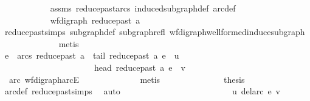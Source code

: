 \begin{isabellebody}
\ \ \ \ \ \ \ \ \ \ \isamarkupfalse%
\ assms\ reduce{\isacharunderscore}{\kern0pt}past{\isacharunderscore}{\kern0pt}arcs{}\ induced{\isacharunderscore}{\kern0pt}subgraph{\isacharunderscore}{\kern0pt}def\ arc{\isacharunderscore}{\kern0pt}def\ \isanewline
\ \ \ \ \ \ \ \ \isamarkupfalse%
\ {\isacharminus}{\kern0pt}\isanewline
\ \ \ \ \ \ \ \ \ \ \isamarkupfalse%
\ {\isachardoublequoteopen}wf{\isacharunderscore}{\kern0pt}digraph\ {\isacharparenleft}{\kern0pt}reduce{\isacharunderscore}{\kern0pt}past\ a{\isacharparenright}{\kern0pt}{\isachardoublequoteclose}\isanewline
\ \ \ \ \ \ \ \ \ \ \ \ \isamarkupfalse%
\ reduce{\isacharunderscore}{\kern0pt}past{\isachardot}{\kern0pt}simps\ subgraph{\isacharunderscore}{\kern0pt}def\ subgraph{\isacharunderscore}{\kern0pt}refl\ wf{\isacharunderscore}{\kern0pt}digraph{\isachardot}{\kern0pt}wellformed{\isacharunderscore}{\kern0pt}induce{\isacharunderscore}{\kern0pt}subgraph\isanewline
\ \ \ \ \ \ \ \ \ \ \ \ \isamarkupfalse%
\ metis\isanewline
\ \ \ \ \ \ \ \ \ \ \isamarkupfalse%
\ \isamarkupfalse%
\ {\isachardoublequoteopen}e\ {\isasymin}\ arcs\ {\isacharparenleft}{\kern0pt}reduce{\isacharunderscore}{\kern0pt}past\ a{\isacharparenright}{\kern0pt}\ {\isasymand}\ tail\ {\isacharparenleft}{\kern0pt}reduce{\isacharunderscore}{\kern0pt}past\ a{\isacharparenright}{\kern0pt}\ e\ {\isacharequal}{\kern0pt}\ u\isanewline
\ \ \ \ \ \ \ \ \ \ \ \ \ \ \ \ \ \ \ \ \ {\isasymand}\ head\ {\isacharparenleft}{\kern0pt}reduce{\isacharunderscore}{\kern0pt}past\ a{\isacharparenright}{\kern0pt}\ e\ {\isacharequal}{\kern0pt}\ v{\isachardoublequoteclose}\isanewline
\ \ \ \ \ \ \ \ \ \ \ \ \isamarkupfalse%
\ \ arc\ wf{\isacharunderscore}{\kern0pt}digraph{\isachardot}{\kern0pt}arcE\isanewline
\ \ \ \ \ \ \ \ \ \ \ \ \isamarkupfalse%
\ metis\ \isanewline
\ \ \ \ \ \ \ \ \ \ \isamarkupfalse%
\ \isamarkupfalse%
\ {\isacharquery}{\kern0pt}thesis\isanewline
\ \ \ \ \ \ \ \ \ \ \ \ \isamarkupfalse%
\ arc{\isacharunderscore}{\kern0pt}def\ reduce{\isacharunderscore}{\kern0pt}past{\isachardot}{\kern0pt}simps\ \isamarkupfalse%
\ auto\isanewline
\ \ \ \ \ \ \ \ \isamarkupfalse%
\ \ \ \ \isanewline
\ \ \ \ \ \ \ \ \isamarkupfalse%
\ \isamarkupfalse%
\ {\isachardoublequoteopen}{\isasymnot}\ u\ {\isasymrightarrow}\isactrlsup {\isacharasterisk}{\kern0pt}\isactrlbsub del{\isacharunderscore}{\kern0pt}arc\ e\isactrlesub \ v{\isachardoublequoteclose}\isanewline

\end{isabellebody}
